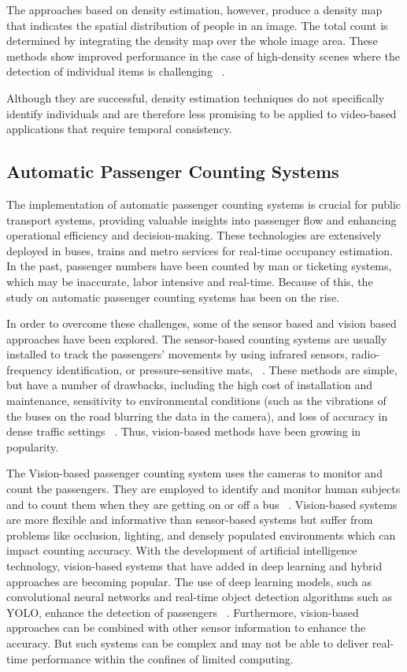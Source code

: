 The approaches based on density estimation, however, produce a density map that indicates the spatial distribution of people in an image. The total count is determined by integrating the density map over the whole image area. These methods show improved performance in the case of high-density scenes where the detection of individual items is challenging ~\cite{Zhang2016}.

Although they are successful, density estimation techniques do not specifically identify individuals and are therefore less promising to be applied to video-based applications that require temporal consistency.

\subsection{Automatic Passenger Counting Systems}

The implementation of automatic passenger counting systems is crucial for public transport systems, providing valuable insights into passenger flow and enhancing operational efficiency and decision-making. These technologies are extensively deployed in buses, trains and metro services for real-time occupancy estimation. In the past, passenger numbers have been counted by man or ticketing systems, which may be inaccurate, labor intensive and real-time. Because of this, the study on automatic passenger counting systems has been on the rise.

In order to overcome these challenges, some of the sensor based and vision based approaches have been explored. The sensor-based counting systems are usually installed to track the passengers' movements by using infrared sensors, radio-frequency identification, or pressure-sensitive mats, ~\cite{Aleksander2024}. These methods are simple, but have a number of drawbacks, including the high cost of installation and maintenance, sensitivity to environmental conditions (such as the vibrations of the buses on the road blurring the data in the camera), and loss of accuracy in dense traffic settings ~\cite{Irene2019}. Thus, vision-based methods have been growing in popularity.

The Vision-based passenger counting system uses the cameras to monitor and count the passengers. They are employed to identify and monitor human subjects and to count them when they are getting on or off a bus ~\cite{Saddam2020}. Vision-based systems are more flexible and informative than sensor-based systems but suffer from problems like occlusion, lighting, and densely populated environments which can impact counting accuracy. With the development of artificial intelligence technology, vision-based systems that have added in deep learning and hybrid approaches are becoming popular. The use of deep learning models, such as convolutional neural networks and real-time object detection algorithms such as YOLO, enhance the detection of passengers ~\cite{Hsu2020}. Furthermore, vision-based approaches can be combined with other sensor information to enhance the accuracy. But such systems can be complex and may not be able to deliver real-time performance within the confines of limited computing. 

